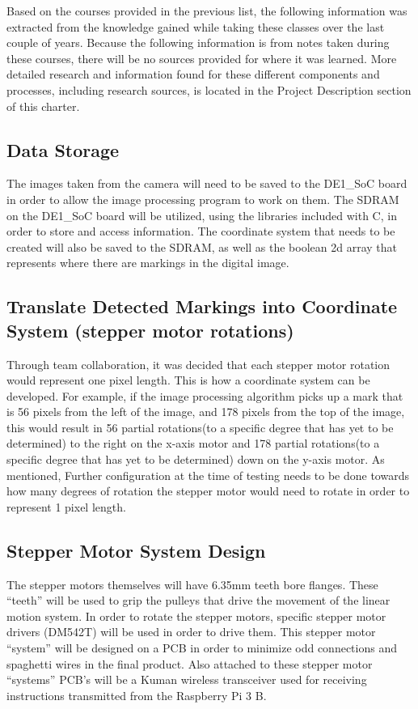 Based on the courses provided in the previous list, the following information was extracted from the knowledge gained while taking these classes over the last couple of years. Because the following information is from notes taken during these courses, there will be no sources provided for where it was learned. More detailed research and information found for these different components and processes, including research sources, is located in the Project Description section of this charter.

\subsection{Data Storage}
The images taken from the camera will need to be saved to the DE1\_SoC board in order to allow the image processing program to work on them. The SDRAM on the DE1\_SoC board will be utilized, using the libraries included with C, in order to store and access information. The coordinate system that needs to be created will also be saved to the SDRAM, as well as the boolean 2d array that represents where there are markings in the digital image.
\subsection{Translate Detected Markings into Coordinate System (stepper motor rotations)}
Through team collaboration, it was decided that each stepper motor rotation would represent one pixel length. This is how a coordinate system can be developed. For example, if the image processing algorithm picks up a mark that is 56 pixels from the left of the image, and 178 pixels from the top of the image, this would result in 56 partial rotations(to a specific degree that has yet to be determined) to the right on the x-axis motor and 178 partial rotations(to a specific degree that has yet to be determined) down on the y-axis motor. As mentioned, Further configuration at the time of testing needs to be done towards how many degrees of rotation the stepper motor would need to rotate in order to represent 1 pixel length.

\subsection{Stepper Motor System Design}
The stepper motors themselves will have 6.35mm teeth bore flanges. These “teeth” will be used to grip the pulleys that drive the movement of the linear motion system. In order to rotate the stepper motors, specific stepper motor drivers (DM542T) will be used in order to drive them. This stepper motor “system” will be designed on a PCB in order to minimize odd connections and spaghetti wires in the final product. Also attached to these stepper motor “systems” PCB’s will be a Kuman wireless transceiver used for receiving instructions transmitted from the Raspberry Pi 3 B.
